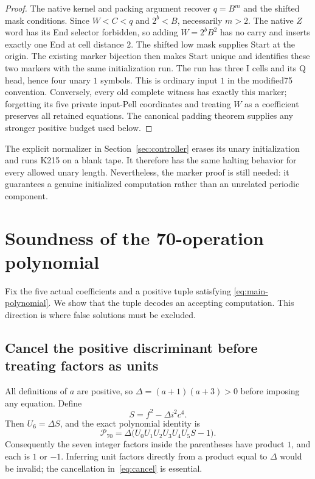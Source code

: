 \documentclass[11pt]{article}
\theoremstyle{definition}
\newcommand{\norms}{\mathcal P}
\begin{document}
\begin{proof}
The native kernel and packing argument recover $q=B^m$ and the shifted mask
conditions. Since $W<C<q$ and $2^b<B$, necessarily $m>2$.
The native $Z$ word has its End selector forbidden, so adding $W=2^bB^2$
has no carry and inserts exactly one End at cell distance $2$. The shifted
low mask supplies Start at the origin. The existing marker bijection then
makes Start unique and identifies these two markers with the same
initialization run. The run has three I cells and its Q head, hence four
unary $1$ symbols. This is ordinary input $1$ in the modified75 convention.
Conversely, every old complete witness has exactly this marker; forgetting
its five private input-Pell coordinates and treating $W$ as a coefficient
preserves all retained equations. The canonical padding theorem supplies
any stronger positive budget used below.
\end{proof}

The explicit normalizer in Section~\ref{sec:controller} erases its unary
initialization and runs K215 on a blank tape. It therefore has the same
halting behavior for every allowed unary length. Nevertheless, the marker
proof is still needed: it guarantees a genuine initialized computation
rather than an unrelated periodic component.

\section{Soundness of the 70-operation polynomial}
\label{sec:soundness}

Fix the five actual coefficients and a positive tuple satisfying
\eqref{eq:main-polynomial}. We show that the tuple decodes an accepting
computation. This direction is where false solutions must be excluded.

\subsection{Cancel the positive discriminant before treating factors as units}

All definitions of $a$ are positive, so
$\Delta=(a+1)(a+3)>0$ before imposing any equation. Define
\[
 S=f^2-\Delta i^2c^4.
\]
Then $U_6=\Delta S$, and the exact polynomial identity is
\begin{equation}\label{eq:cancel}
 \norms_{70}
 =\Delta\bigl(U_0U_1U_2U_3U_4U_5S-1\bigr).
\end{equation}
Consequently the seven integer factors inside the parentheses have product
$1$, and each is $1$ or $-1$. Inferring unit factors directly from a product
equal to $\Delta$ would be invalid; the cancellation in~\eqref{eq:cancel}
is essential.
\end{document}
